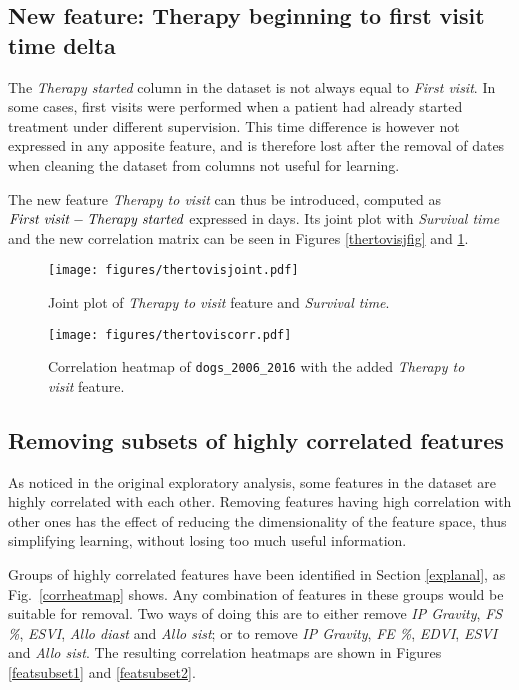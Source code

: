 \documentclass[12pt]{report}
\begin{document}
\subsection*{New feature: Therapy beginning to first visit time delta}
The \textit{Therapy started} column in the dataset is not always equal to \textit{First visit}. In some cases, first visits were performed when a patient had already started treatment under different supervision. This time difference is however not expressed in any apposite feature, and is therefore lost after the removal of dates when cleaning the dataset from columns not useful for learning.

The new feature \textit{Therapy to visit} can thus be introduced, computed as $ \text{\emph{First visit}} - \text{\emph{Therapy started}} $ expressed in days. Its joint plot with \textit{Survival time} and the new correlation matrix can be seen in Figures \ref{thertovisjfig} and \ref{thertoviscfig}.

\begin{figure}[hp]
  \centering
  	\texttt{[image: figures/thertovisjoint.pdf]}
  \caption{Joint plot of \textit{Therapy to visit} feature and \textit{Survival time}.}
  \label{thertovisjfig}
  \vspace{0.7cm}
  \centering
  	\texttt{[image: figures/thertoviscorr.pdf]}
  \caption{Correlation heatmap of \texttt{dogs\_2006\_2016} with the added \textit{Therapy to visit} feature.}
  \label{thertoviscfig}
\end{figure}

\subsection*{Removing subsets of highly correlated features}
As noticed in the original exploratory analysis, some features in the dataset are highly correlated with each other. Removing features having high correlation with other ones has the effect of reducing the dimensionality of the feature space, thus simplifying learning, without losing too much useful information.

Groups of highly correlated features have been identified in Section \ref{explanal}, as Fig.\ \ref{corrheatmap} shows. Any combination of features in these groups would be suitable for removal. Two ways of doing this are to either remove \textit{IP Gravity}, \textit{FS \%}, \textit{ESVI}, \textit{Allo diast} and \textit{Allo sist}; or to remove \textit{IP Gravity}, \textit{FE \%}, \textit{EDVI}, \textit{ESVI} and \textit{Allo sist}. The resulting correlation heatmaps are shown in Figures \ref{featsubset1} and \ref{featsubset2}.
\end{document}
